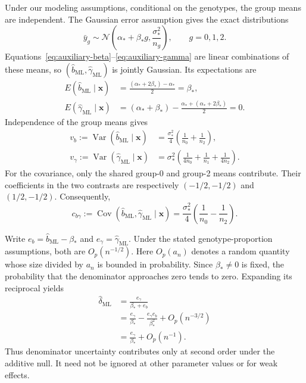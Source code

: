 \documentclass[11pt]{article}
\newcommand{\Normal}{\mathcal{N}}
\begin{document}
Under our modeling assumptions, conditional on the genotypes, the
group means are independent. The Gaussian error assumption gives
the exact distributions
\begin{equation}
\bar y_g\sim\Normal\left(\alpha_*+\beta_*g,
                         \frac{\sigma_*^2}{n_g}\right),
\qquad g=0,1,2.
\label{eq:group-mean-law}
\end{equation}
Equations~\eqref{eq:auxiliary-beta}--\eqref{eq:auxiliary-gamma}
are linear combinations of these means, so
$(\widehat b_{\mathrm{ML}},\widehat\gamma_{\mathrm{ML}})$ is
jointly Gaussian. Its expectations are
\begin{align}
E(\widehat b_{\mathrm{ML}}\mid\mathbf x)
 &=\frac{(\alpha_*+2\beta_*)-\alpha_*}{2}=\beta_*,\nonumber\\
E(\widehat\gamma_{\mathrm{ML}}\mid\mathbf x)
 &=(\alpha_*+\beta_*)-\frac{\alpha_*+(\alpha_*+2\beta_*)}{2}=0.
\end{align}
Independence of the group means gives
\begin{align}
v_b:=\operatorname{Var}(\widehat b_{\mathrm{ML}}\mid\mathbf x)
 &=\frac{\sigma_*^2}{4}\left(\frac1{n_0}+\frac1{n_2}\right),
\label{eq:auxiliary-beta-variance}\\
v_\gamma:=\operatorname{Var}(\widehat\gamma_{\mathrm{ML}}\mid\mathbf x)
 &=\sigma_*^2\left(\frac1{4n_0}+\frac1{n_1}+\frac1{4n_2}\right).
\label{eq:auxiliary-gamma-variance}
\end{align}
For the covariance, only the shared group-0 and group-2 means
contribute. Their coefficients in the two contrasts are respectively
$(-1/2,-1/2)$ and $(1/2,-1/2)$. Consequently,
\begin{equation}
c_{b\gamma}:=\operatorname{Cov}
 (\widehat b_{\mathrm{ML}},\widehat\gamma_{\mathrm{ML}}\mid\mathbf x)
 =\frac{\sigma_*^2}{4}\left(\frac1{n_0}-\frac1{n_2}\right).
\label{eq:auxiliary-covariance}
\end{equation}

Write $e_b=\widehat b_{\mathrm{ML}}-\beta_*$ and
$e_\gamma=\widehat\gamma_{\mathrm{ML}}$. Under the stated
genotype-proportion assumptions, both are $O_p(n^{-1/2})$.
Here $O_p(a_n)$ denotes a random quantity whose size divided by
$a_n$ is bounded in probability. Since $\beta_*\neq0$ is fixed,
the probability that the denominator approaches zero tends to zero.
Expanding its reciprocal yields
\begin{align}
\widehat\delta_{\mathrm{ML}}
 &=\frac{e_\gamma}{\beta_*+e_b}\nonumber\\
 &=\frac{e_\gamma}{\beta_*}
   -\frac{e_\gamma e_b}{\beta_*^2}+O_p(n^{-3/2})\nonumber\\
 &=\frac{e_\gamma}{\beta_*}+O_p(n^{-1}).
\label{eq:ratio-expansion}
\end{align}
Thus denominator uncertainty contributes only at second order
under the additive null. It need not be ignored at other parameter
values or for weak effects.
\end{document}
